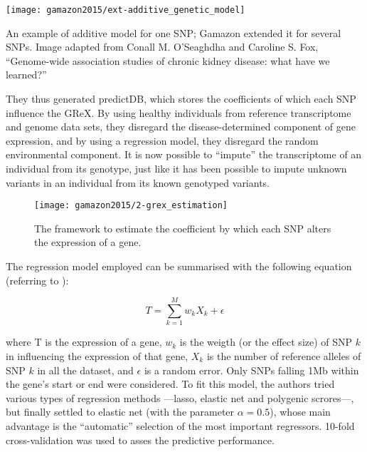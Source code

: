 \documentclass[../main.tex]{subfiles}
\begin{document}
\begin{marginfigure}
	\texttt{[image: gamazon2015/ext-additive\_genetic\_model]}
	\caption{An example of additive model for one SNP; Gamazon \etal 
extended it for several SNPs. Image adapted from Conall M. O'Seaghdha 
and Caroline S. Fox, \enquote{Genome-wide association studies of chronic 
kidney disease: what have we learned?}}
\end{marginfigure}

They thus generated predictDB, which stores the coefficients of which 
each SNP influence the GReX. By using healthy individuals from reference 
transcriptome and genome data sets, they disregard the 
disease-determined component of gene expression, and by using a 
regression model, they disregard the random environmental component. It 
is now possible to \enquote{impute} the transcriptome of an individual 
from its genotype, just like it has been possible to impute unknown 
variants in an individual from its known genotyped variants.

\begin{figure}
	\texttt{[image: gamazon2015/2-grex\_estimation]}
	\caption{The framework to estimate the coefficient by which each SNP 
		alters the expression of a gene.}
\end{figure}

The regression model employed can be summarised with the following 
equation (referring to ):

\begin{equation}
	T = \sum_{k=1}^{M}w_k X_k + \epsilon
\end{equation}

where T is the expression of a gene, $w_k$ is the weigth (or the effect 
size) of SNP $k$ in influencing the expression of that gene, $X_k$ is 
the number of reference alleles of SNP $k$ in all the dataset, and 
$\epsilon$ is a random error. Only SNPs falling 1Mb within the gene's 
start or end were considered. To fit this model, the authors tried 
various types of regression methods ---lasso, elastic net and polygenic 
scrores---, but finally settled to elastic net (with the parameter $\alpha = 0.5$), 
whose main advantage is the \enquote{automatic} selection of the most 
important regressors. 10-fold cross-validation was used to asses the 
predictive performance.
\end{document}
